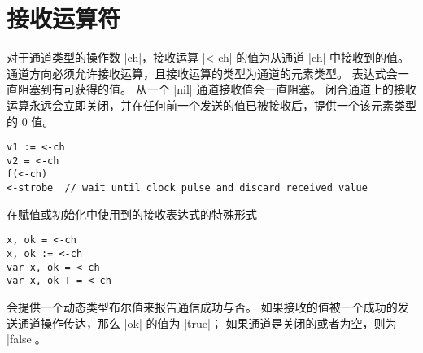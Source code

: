 \section{接收运算符} \label{sec:recv operator}
对于\hyperref[sec:channel type]{通道类型}的操作数 \gocode|ch|，接收运算 \gocode|<-ch| 的值为从通道 \gocode|ch| 中接收到的值。
通道方向必须允许接收运算，且接收运算的类型为通道的元素类型。
表达式会一直阻塞到有可获得的值。
从一个 \gocode|nil| 通道接收值会一直阻塞。
闭合通道上的接收运算永远会立即关闭，并在任何前一个发送的值已被接收后，提供一个该元素类型的 0 值。
\begin{lstlisting}[style=golang]
v1 := <-ch
v2 = <-ch
f(<-ch)
<-strobe  // wait until clock pulse and discard received value
\end{lstlisting}

在赋值或初始化中使用到的接收表达式的特殊形式
\begin{lstlisting}[style=golang]
x, ok = <-ch
x, ok := <-ch
var x, ok = <-ch
var x, ok T = <-ch
\end{lstlisting}
会提供一个动态类型布尔值来报告通信成功与否。
如果接收的值被一个成功的发送通道操作传达，那么 \gocode|ok| 的值为 \gocode|true|；
如果通道是关闭的或者为空，则为 \gocode|false|。

